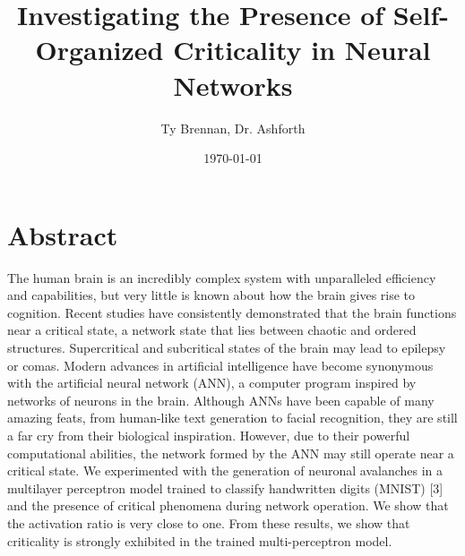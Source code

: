 \documentclass[letterpaper, 12pt]{article}
\title{Investigating the Presence of Self-Organized Criticality in Neural Networks}
\author{Ty Brennan, Dr. Ashforth}
\date{\today}
\begin{document}
\maketitle

\section*{Abstract}

The human brain is an incredibly complex system with unparalleled efficiency and capabilities, but very little is known about how the brain gives rise to cognition. 
Recent studies have consistently demonstrated that the brain functions near a critical state, a network state that lies between chaotic and ordered structures. 
Supercritical and subcritical states of the brain may lead to epilepsy or comas. 
Modern advances in artificial intelligence have become synonymous with the artificial neural network (ANN), a computer program inspired by networks of neurons in the brain. 
Although ANNs have been capable of many amazing feats, from human-like text generation to facial recognition, they are still a far cry from their biological inspiration. 
However, due to their powerful computational abilities, the network formed by the ANN may still operate near a critical state. 
We experimented with the generation of neuronal avalanches in a multilayer perceptron model trained to classify handwritten digits (MNIST) [3] and the presence of critical phenomena during network operation. 
We show that the activation ratio is very close to one. From these results, we show that criticality is strongly exhibited in the trained multi-perceptron model.  
\end{document}
